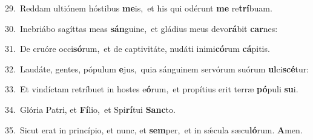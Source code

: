 {\numbfont\textcolor{\numbcolor}{29.}}~Reddam ultiónem hóstibus \textbf{me}\-is,~\star et his qui odérunt \textbf{me} re\-\textbf{trí}\-buam.\par
{\numbfont\textcolor{\numbcolor}{30.}}~Inebriábo sagíttas meas \textbf{sán}\-guine,~\star et gládius meus devo\-\textbf{rá}\-bit \textbf{car}\-nes:\par
{\numbfont\textcolor{\numbcolor}{31.}}~De cruóre occi\-\textbf{só}\-rum,~\star et de captivitáte, nudáti inimi\-\textbf{có}\-rum \textbf{cá}\-pitis.\par
{\numbfont\textcolor{\numbcolor}{32.}}~Laudáte, gentes, pópulum \textbf{e}\-jus,~\star quia sánguinem servórum suórum \textbf{ul}\-ci\-\textbf{scé}\-tur:\par
{\numbfont\textcolor{\numbcolor}{33.}}~Et vindíctam retríbuet in hostes e\-\textbf{ó}\-rum,~\star et propítius erit terræ \textbf{pó}\-puli \textbf{su}\-i.\par
{\numbfont\textcolor{\numbcolor}{34.}}~Glória Patri, et \textbf{Fí}\-lio,~\star et Spi\-\textbf{rí}\-tui \textbf{Sanc}\-to.\par
{\numbfont\textcolor{\numbcolor}{35.}}~Sicut erat in princípio, et nunc, et \textbf{sem}\-per,~\star et in sǽcula sæcu\-\textbf{ló}\-rum. \textbf{A}\-men.\par
